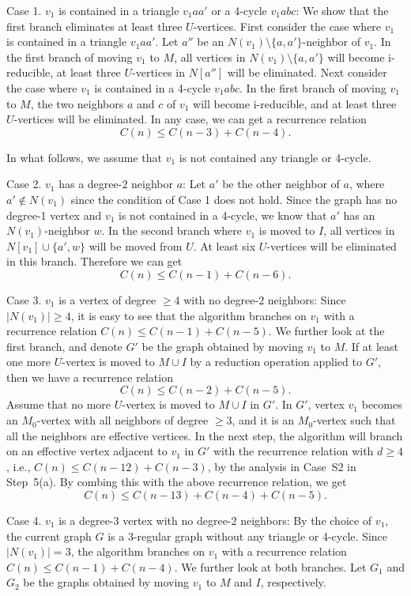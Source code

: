 \documentclass{elsart_TR2}
\begin{document}
Case 1. $v_1$ is contained in a triangle $v_1aa'$ or a 4-cycle $v_1abc$:
We show that the first  branch eliminates at least three $U$-vertices.
First consider the case where $v_1$ is contained in a triangle $v_1aa'$.
Let $a''$ be an $N(v_1)\setminus\{a,a'\}$-neighbor of $v_1$.
In the first branch of moving $v_1$ to $M$,
 all vertices in $N(v_1)\setminus\{a,a'\}$ will become i-reducible,
at least three $U$-vertices in $N[a'']$ will be eliminated.
Next consider the case where  $v_1$ is contained in a 4-cycle $v_1abc$.
In the first branch of moving $v_1$ to $M$, the two neighbors $a$ and $c$ of $v_1$ will become i-reducible,
and at least three $U$-vertices will be eliminated.
In any case, we can get a recurrence relation
$$C(n)\leq C(n-3)+C(n-4).$$

In what follows, we assume that $v_1$ is not contained any triangle or 4-cycle.

Case 2. $v_1$ has a degree-2 neighbor $a$:
Let $a'$ be the other neighbor of $a$, where $a'\not\in N(v_1)$
 since the condition of Case 1 does not hold.
Since the graph has no degree-1 vertex and $v_1$ is not contained in a 4-cycle,
we know that $a'$ has an $N(v_1)$-neighbor $w$.
In the second branch where $v_1$ is moved to $I$,
all vertices in $N[v_1]\cup \{a',w\}$ will be moved from $U$.
At least six $U$-vertices will be eliminated in this branch. Therefore we can get
$$C(n)\leq C(n-1)+C(n-6).$$

Case 3. $v_1$ is a vertex of degree $\geq 4$ with no degree-2 neighbors:
Since $|N(v_1)|\geq4$, it is easy to see that the algorithm  branches on $v_1$ with a recurrence relation
 $C(n)\leq C(n-1)+C(n-5)$.
We further look at the first branch, and denote $G'$ be the graph obtained by moving $v_1$ to $M$.
If at least one more $U$-vertex is moved to $M\cup I$ by a reduction operation applied to $G'$, then
we have a recurrence relation
$$C(n)\leq C(n-2)+C(n-5).$$
Assume that no more $U$-vertex is moved to $M\cup I$ in $G'$.
In $G'$,
vertex $v_1$ becomes an $M_0$-vertex with all neighbors of degree $\geq 3$,
and it is
an $M_0$-vertex such that all the neighbors are effective vertices.
In the next step, the algorithm will branch on an effective vertex adjacent to $v_1$ in $G'$
 with the recurrence relation    with $d\geq 4$, i.e., $C(n)\leq C(n-12)+C(n-3)$,
by the analysis in Case~S2 in Step~5(a).
By combing this with the above recurrence relation, we get
$$C(n)\leq C(n-13)+C(n-4)+C(n-5).$$

Case 4. $v_1$ is a degree-3  vertex with no degree-2 neighbors:
By the choice of $v_1$, the current graph $G$  is a 3-regular graph without any triangle or 4-cycle.
Since $|N(v_1)|=3$,   the algorithm  branches on $v_1$ with a recurrence relation
 $C(n)\leq C(n-1)+C(n-4)$.
We further look at both branches.
Let $G_1$ and $G_2$ be the graphs obtained by moving $v_1$ to $M$ and $I$, respectively.
\end{document}
